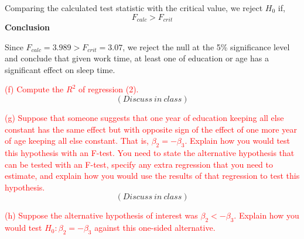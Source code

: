 \documentclass[12pt]{report}
\begin{document}
\noindent Comparing the calculated test statistic with the critical value, we reject $H_0$ if,
$$F_{calc} > F_{crit}$$
\noindent \textbf{Conclusion}

\noindent Since $F_{calc}=3.989 > F_{crit}=3.07$, we reject the null at the 5\% significance level and conclude that given work time, at least one of education or age has a significant effect on sleep time.

\noindent \textcolor{red}{(f) Compute the $R^2$ of regression (2).} $$(Discuss\ in\ class)$$

\noindent \textcolor{red}{(g) Suppose that someone suggests that one year of education keeping all else constant has the same effect but with opposite sign of the effect of one more year of age keeping all else constant. That is, $\beta_2 = -\beta_3$. Explain how you would test this hypothesis with an F-test. You need to state the alternative hypothesis that can be tested with an F-test, specify any extra regression that you need to estimate, and explain how you would use the results of that regression to test this hypothesis.} $$(Discuss\ in\ class)$$

\noindent \textcolor{red}{(h) Suppose the alternative hypothesis of interest was $\beta_2 < -\beta_3$. Explain how you would test $H_0: \beta_2 = -\beta_3$ against this one-sided alternative.}
\end{document}
